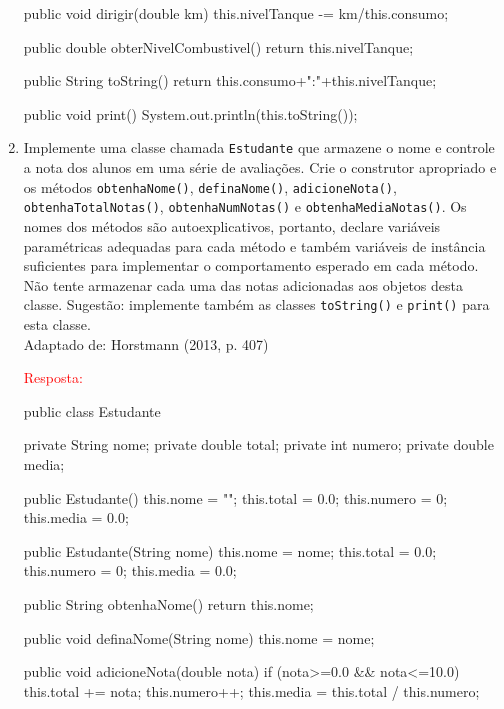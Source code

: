 \documentclass[onecolumn,a4paper,10pt]{report}
\newcommand{\+}{\, + \,}
\newcommand{\<}{\hspace*{-0.4cm}}
\begin{document}
\begin{enumerate}
{\begin{javacode}
{    public void dirigir(double km) {
        this.nivelTanque -= km/this.consumo;
    }
    
    public double obterNivelCombustivel() {
        return this.nivelTanque;
    }
    
    public String toString() {
        return this.consumo+":"+this.nivelTanque;
    }

    public void print() {
        System.out.println(this.toString());
    }
}
\end{javacode}
}
\newpage

\item Implemente uma classe chamada \texttt{Estudante} que armazene o nome e controle a nota dos alunos em uma série de avaliações. Crie o construtor apropriado e os métodos \texttt{obtenhaNome()}, \texttt{definaNome()}, \texttt{adicioneNota()}, \texttt{obtenhaTotalNotas()}, \texttt{obtenhaNumNotas()} e \texttt{obtenhaMediaNotas()}. Os nomes dos métodos são autoexplicativos, portanto, declare variáveis paramétricas adequadas para cada método e também variáveis de instância suficientes para implementar o comportamento esperado em cada método. Não tente armazenar cada uma das notas adicionadas aos objetos desta classe. Sugestão: implemente também as classes \texttt{toString()} e \texttt{print()} para esta classe.\\
{\tiny Adaptado de: Horstmann (2013, p. 407)}\\
{\tiny \textcolor{red}{Resposta:}\\
\begin{javacode}
public class Estudante {
    private String nome;
    private double total;
    private int numero;
    private double media;
    
    public Estudante() {
        this.nome = "";
        this.total = 0.0;
        this.numero = 0;
        this.media = 0.0;
    }
    
    public Estudante(String nome) {
        this.nome = nome;
        this.total = 0.0;
        this.numero = 0;
        this.media = 0.0;
    }
    
    public String obtenhaNome() {
        return this.nome;
    }
    
    public void definaNome(String nome) {
        this.nome = nome;
    }
    
    public void adicioneNota(double nota) {
        if (nota>=0.0 && nota<=10.0) {
            this.total += nota;
            this.numero++;
            this.media = this.total / this.numero;
        }
    }
    
}
\end{javacode}}
\end{enumerate}
\end{document}
